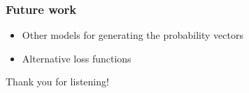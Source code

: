 \documentclass[british]{beamer}
\begin{document}
  \begin{frame}
    \frametitle{Future work}
    
    \begin{itemize}
     \item Other models for generating the probability vectors
     \item Alternative loss functions
    \end{itemize}
  \end{frame}
  
  \begin{frame}
   Thank you for listening!
  \end{frame}


  
\end{document}
